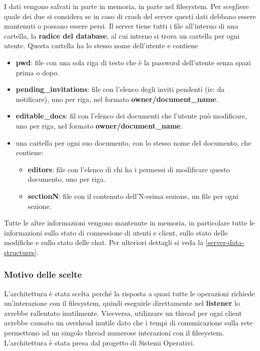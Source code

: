 \documentclass[a4paper]{article}
\theoremstyle{theorem}
\theoremstyle{remark}
\theoremstyle{definition}
\theoremstyle{corollary}
\theoremstyle{lemma}
\begin{document}
I dati vengono salvati in parte in memoria, in parte nel filesystem. Per scegliere quale dei due si considera se in caso di crash del server questi dati debbano essere mantenuti o possano essere persi. Il server tiene tutti i file all'interno di una cartella, la \textbf{radice del database}, al cui interno si trova un cartella per ogni utente. Questa cartella ha lo stesso nome dell'utente e contiene
\begin{itemize}
	\item \textbf{pwd}: file con una sola riga di testo che è la password dell'utente senza spazi prima o dopo.
	\item \textbf{pending\_invitations}: file con l'elenco degli inviti pendenti (ie: da notificare), uno per riga, nel formato \textbf{owner/document\_name}.
	\item \textbf{editable\_docs}: fil con l'elenco dei documenti che l'utente può modificare, uno per riga, nel formato \textbf{owner/document\_name}.
		\item una cartella per ogni suo documento, con lo stesso nome del documento, che contiene:
		\begin{itemize}
			\item \textbf{editors}: file con l'elenco di chi ha i permessi di modificare questo documento, uno per riga.
			\item \textbf{sectionN}: file con il contenuto dell'N-esima sezione, un file per ogni sezione.
		\end{itemize}
\end{itemize}

Tutte le altre informazioni vengono mantenute in memoria, in particolare tutte le informazioni sullo stato di connessione di utenti e client, sullo stato delle modifiche e sullo stato delle chat. Per ulteriori dettagli si veda la \autoref{server-data-structures}.

\subsubsection{Motivo delle scelte}
L'architettura è stata scelta perché la risposta a quasi tutte le operazioni richiede un'interazione con il filesystem, quindi eseguirle direttamente nel \textbf{listener} lo avrebbe rallentato inutilmente. Viceversa, utilizzare un thread per ogni client avrebbe causato un overhead inutile dato che i tempi di comunicazione sulla rete permettono ad un singolo thread numerose interazioni con il filesystem. L'architettura è stata presa dal progetto di Sistemi Operativi.
\end{document}
